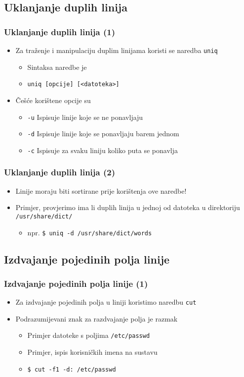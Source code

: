 \documentclass{beamer}
\newcommand{\shell}[1]{\texttt{#1}}
\begin{document}
\subsection{Uklanjanje duplih linija}
\begin{frame}[t]
\frametitle{Uklanjanje duplih linija (1)}
\begin{itemize}
  \item Za traženje i manipulaciju duplim linijama koristi se naredba
        \shell{uniq}
  \begin{itemize}
    \item Sintaksa naredbe je
    \item[] \shell{uniq [opcije] [<datoteka>]}
  \end{itemize}
  \item Češće korištene opcije su
  \begin{itemize}
    \item[] \shell{-u} Ispisuje linije koje se ne ponavljaju
    \item[] \shell{-d} Ispisuje linije koje se ponavljaju barem jednom
    \item[] \shell{-c} Ispisuje za svaku liniju koliko puta se ponavlja
  \end{itemize}
\end{itemize}
\end{frame}

\begin{frame}[t]
\frametitle{Uklanjanje duplih linija (2)}
\begin{itemize}
  \item Linije moraju biti sortirane prije korištenja ove naredbe!
  \item Primjer, provjerimo ima li duplih linija u jednoj od datoteka u direktoriju
        \shell{/usr/share/dict/}
  \begin{itemize}
    \item[] npr. \shell{\$ uniq -d /usr/share/dict/words}
  \end{itemize}
\end{itemize}
\end{frame}

\subsection{Izdvajanje pojedinih polja linije}
\begin{frame}[t]
\frametitle{Izdvajanje pojedinih polja linije (1)}
\begin{itemize}
  \item Za izdvajanje pojedinih polja u liniji koristimo naredbu
        \shell{cut}
  \item Podrazumijevani znak za razdvajanje polja je razmak
  \begin{itemize}
    \item Primjer datoteke s poljima \shell{/etc/passwd}
    \item Primjer, ispis korisničkih imena na sustavu
    \item[] \shell{\$ cut -f1 -d: /etc/passwd}
  \end{itemize}
\end{itemize}
\end{frame}
\end{document}
